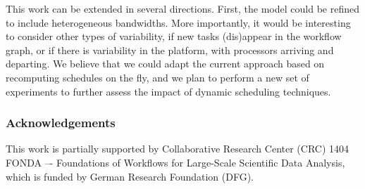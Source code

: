 \documentclass[conference]{IEEEtran}
\begin{document}
This work can be extended in several directions. First, the model could be refined to include
heterogeneous bandwidths. %
More importantly, it would be interesting to consider other types of variability, \egc
if new tasks (dis)appear in the workflow graph, or if there is variability in the platform, 
with processors arriving and departing. We believe that we could adapt the current approach
based on recomputing schedules on the fly, and we plan to perform a new set of experiments
to further assess the impact of dynamic scheduling techniques. 


\subsubsection*{Acknowledgements}
This work is partially supported by Collaborative Research Center (CRC) 1404 FONDA
–- Foundations of Workflows for Large-Scale Scientific Data Analysis, which is funded
by German Research Foundation (DFG).


\balance
    
\end{document}
